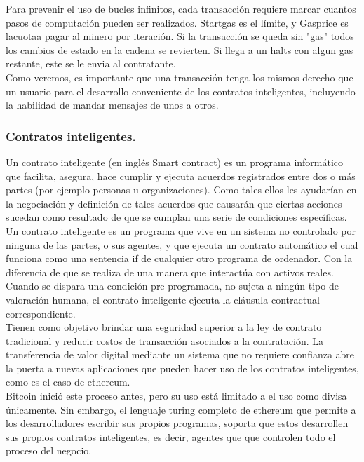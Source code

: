 \documentclass[11pt,a4paper]{article}
\begin{document}
Para prevenir el uso de bucles infinitos, cada transacción requiere marcar cuantos pasos de computación pueden ser realizados. Startgas es el límite, y Gasprice es lacuotaa pagar al minero por iteración. Si la transacción se queda sin "gas" todos los cambios de estado en la cadena se revierten. Si llega a un halts con algun gas restante, este se le envia al contratante. \\

Como veremos, es importante que una transacción tenga los mismos derecho que un usuario para el desarrollo conveniente de los contratos inteligentes, incluyendo la habilidad de mandar mensajes de unos a otros.\\


\subsubsection{Contratos inteligentes.}

Un contrato inteligente (en inglés Smart contract) es un programa informático que facilita, asegura, hace cumplir y ejecuta acuerdos registrados entre dos o más partes (por ejemplo personas u organizaciones). Como tales ellos les ayudarían en la negociación y definición de tales acuerdos que causarán que ciertas acciones sucedan como resultado de que se cumplan una serie de condiciones específicas.\\

Un contrato inteligente es un programa que vive en un sistema no controlado por ninguna de las partes, o sus agentes, y que ejecuta un contrato automático el cual funciona como una sentencia if de cualquier otro programa de ordenador. Con la diferencia de que se realiza de una manera que interactúa con activos reales. Cuando se dispara una condición pre-programada, no sujeta a ningún tipo de valoración humana, el contrato inteligente ejecuta la cláusula contractual correspondiente.\\

Tienen como objetivo brindar una seguridad superior a la ley de contrato tradicional y reducir costos de transacción asociados a la contratación. La transferencia de valor digital mediante un sistema que no requiere confianza abre la puerta a nuevas aplicaciones que pueden hacer uso de los contratos inteligentes, como es el caso de ethereum.\\

Bitcoin inició este proceso antes, pero su uso está limitado a el uso como divisa únicamente. Sin embargo, el lenguaje turing completo de ethereum que permite a los desarrolladores escribir sus propios programas, soporta que estos desarrollen sus propios contratos inteligentes, es decir, agentes que que controlen todo el proceso del negocio.\\
\end{document}
